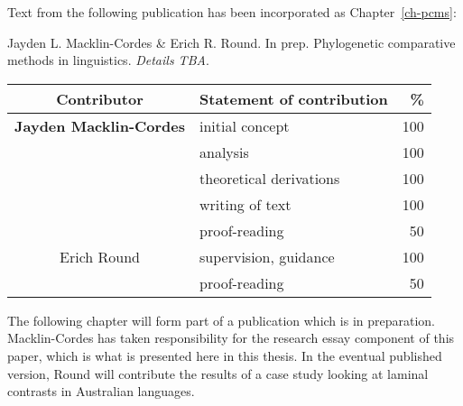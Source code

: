 \cleartoevenpage
\pagestyle{empty}	

\noindent
Text from the following publication has been incorporated as Chapter~\ref{ch-pcms}:

\noindent
Jayden L. Macklin-Cordes & Erich R. Round. In prep. Phylogenetic comparative methods in linguistics. \emph{Details TBA}.

\begin{table}[h]
	\centering
	\begin{tabular}{clr}
		\toprule
		Contributor & Statement of contribution & \% \\
		\midrule
		\textbf{Jayden Macklin-Cordes}	& initial concept			& 100 \\
		                                & analysis     	            & 100  \\
		                                & theoretical derivations 	& 100  \\
		                                & writing of text 			& 100  \\
										& proof-reading				& 50  \\
		\midrule
		Erich Round						& supervision, guidance 	& 100 \\
										& proof-reading				& 50  \\
		\bottomrule
	\end{tabular}
\end{table}

The following chapter will form part of a publication which is in preparation. Macklin-Cordes has taken responsibility for the research essay component of this paper, which is what is presented here in this thesis. In the eventual published version, Round will contribute the results of a case study looking at laminal contrasts in Australian languages.

